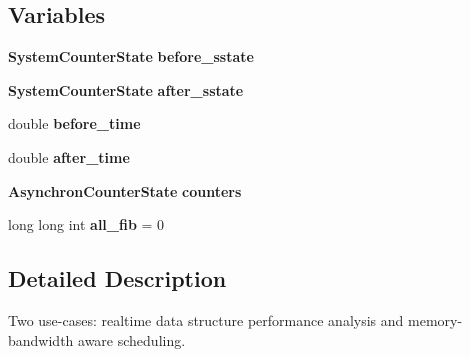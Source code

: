 \subsection*{Variables}
\begin{DoxyCompactItemize}
\item 
{\bf System\+Counter\+State} {\bfseries before\+\_\+sstate}\label{realtime_8cpp_ad0d469a9c20fe7016b9be95e443f5cbd}

\item 
{\bf System\+Counter\+State} {\bfseries after\+\_\+sstate}\label{realtime_8cpp_a3684fa4dfac013348b5abe2b3a602105}

\item 
double {\bfseries before\+\_\+time}\label{realtime_8cpp_a85f10f39fe8cc10213c0bc87ee07187b}

\item 
double {\bfseries after\+\_\+time}\label{realtime_8cpp_a7790f27845e8d48f4f04a0f7c61d93fc}

\item 
{\bf Asynchron\+Counter\+State} {\bfseries counters}\label{realtime_8cpp_a17adfa64106f41a0a9a2a0b65ad301ab}

\item 
long long int {\bfseries all\+\_\+fib} = 0\label{realtime_8cpp_a3fc505aa811b2808316ed55b8466522a}

\end{DoxyCompactItemize}


\subsection{Detailed Description}
Two use-\/cases\+: realtime data structure performance analysis and memory-\/bandwidth aware scheduling. 

